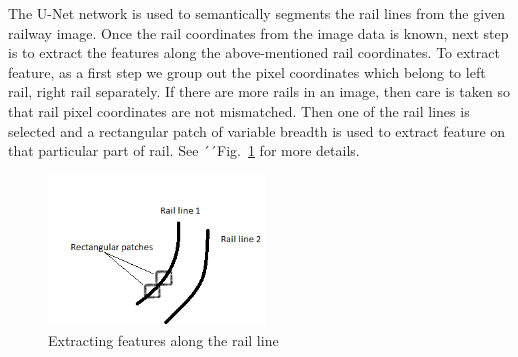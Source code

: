\documentclass[conference]{IEEEtran}
\begin{document}
The U-Net network is used to semantically segments the rail lines from the given railway image. Once the rail coordinates from the image data is known, next step is to extract the features along the above-mentioned rail coordinates. To extract feature, as a first step we group out the pixel coordinates which belong to left rail, right rail separately. If there are more rails in an image, then care is taken so that rail pixel coordinates are not mismatched. Then one of the rail lines is selected and a rectangular patch of variable breadth is used to extract feature on that particular part of rail. See ´´Fig.~\ref{Rail_line} for more details. 
\begin{figure}[htbp]
\centerline{\includegraphics[height=4cm]{Rail_line_illustration.png}}
\caption{Extracting features along the rail line}
\label{Rail_line}
\end{figure} 
\end{document}
